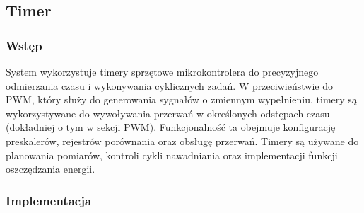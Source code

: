 \subsection{Timer}

\subsubsection{Wstęp}
System wykorzystuje timery sprzętowe mikrokontrolera do precyzyjnego odmierzania czasu i wykonywania cyklicznych zadań. W przeciwieństwie do PWM, który służy do generowania sygnałów o zmiennym wypełnieniu, timery są wykorzystywane do wywoływania przerwań w określonych odstępach czasu (dokładniej o tym w sekcji PWM). Funkcjonalność ta obejmuje konfigurację preskalerów, rejestrów porównania oraz obsługę przerwań. Timery są używane do planowania pomiarów, kontroli cykli nawadniania oraz implementacji funkcji oszczędzania energii.

\subsubsection{Implementacja}



